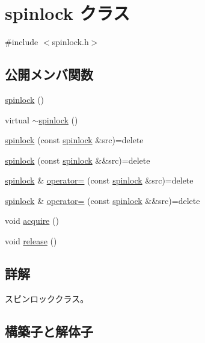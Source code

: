 \hypertarget{classspinlock}{}\section{spinlock クラス}
\label{classspinlock}


{\ttfamily \#include $<$spinlock.\+h$>$}

\subsection*{公開メンバ関数}
\begin{DoxyCompactItemize}
\item 
\hyperlink{classspinlock_a2398277bfffe2e811ccc5af30e8d557b}{spinlock} ()
\item 
virtual \hyperlink{classspinlock_a76cb389d388f3298ac71d72182391d0d}{$\sim$spinlock} ()
\item 
\hyperlink{classspinlock_a26da24b614df2de117fcdd14d5c2d85e}{spinlock} (const \hyperlink{classspinlock}{spinlock} \&src)=delete
\item 
\hyperlink{classspinlock_acadc56246fd003d5baf7ffe8f9b1ed23}{spinlock} (const \hyperlink{classspinlock}{spinlock} \&\&src)=delete
\item 
\hyperlink{classspinlock}{spinlock} \& \hyperlink{classspinlock_a0770087a012a62147ee94e1d0c6fb083}{operator=} (const \hyperlink{classspinlock}{spinlock} \&src)=delete
\item 
\hyperlink{classspinlock}{spinlock} \& \hyperlink{classspinlock_a4a67e0a1797db0dfe37af2ce158a17d0}{operator=} (const \hyperlink{classspinlock}{spinlock} \&\&src)=delete
\item 
void \hyperlink{classspinlock_af5978d97d07ae5f9e8a4cdc91739cf57}{acquire} ()
\item 
void \hyperlink{classspinlock_af1f2e2a0713952b445c8a0754e318c6e}{release} ()
\end{DoxyCompactItemize}


\subsection{詳解}
スピンロッククラス。 

\subsection{構築子と解体子}
\hypertarget{classspinlock_a2398277bfffe2e811ccc5af30e8d557b}{}\label{classspinlock_a2398277bfffe2e811ccc5af30e8d557b} 
